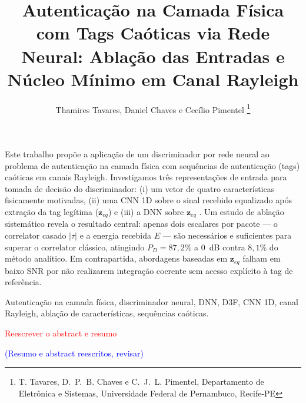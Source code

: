 \documentclass{sbrt}
\newcommand{\bblue}[1]{\textcolor{blue}{#1}}
\newcommand{\rred}[1]{\textcolor{red}{#1}}
\begin{document}
\title{Autenticação na Camada Física com Tags Caóticas via Rede Neural: Ablação das Entradas e Núcleo Mínimo em Canal Rayleigh}

\author{Thamires Tavares, Daniel Chaves e Cecílio Pimentel
\thanks{T. Tavares, D.~P.~B. Chaves e C.~J.~L. Pimentel, Departamento de Eletrônica e Sistemas, Universidade Federal de Pernambuco, Recife-PE}%
}


\maketitle



\begin{resumo}
Este trabalho propõe a aplicação de um discriminador por rede neural ao problema de autenticação na camada física com sequências de autenticação (tags) caóticas em canais Rayleigh. Investigamos três representações de entrada para tomada de decisão do discriminador: (i) um vetor de quatro características fisicamente motivadas, (ii) uma CNN 1D sobre o sinal recebido equalizado após extração da tag legítima ($\mathbf{z}_{eq}$) e (iii) a DNN sobre $\mathbf{z}_{eq}$ . 
Um estudo de ablação sistemático revela o resultado central: apenas dois escalares por pacote — o correlator casado $|\tau|$ e a energia recebida $E$ — são necessários e suficientes para superar o correlator clássico, atingindo $P_D = 87{,}2\%$ a 0~dB contra $8{,}1\%$ do método analítico. Em contrapartida, abordagens baseadas em $\mathbf{z}_{eq}$ falham em baixo SNR por não realizarem integração coerente sem acesso explícito à tag de referência. 

\end{resumo}

\begin{chave}
Autenticação na camada física, discriminador neural, DNN, D3F, CNN 1D, canal Rayleigh, ablação de características, sequências caóticas.
\end{chave}
\rred{Reescrever o abstract e resumo}


\bblue{ (Resumo e abstract reescritos, revisar)}
\end{document}
